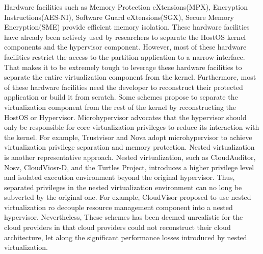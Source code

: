 
Hardware facilities such as Memory Protection eXtensions(MPX), Encryption Instructions(AES-NI), Software Guard eXtensions(SGX), Secure Memory Encryption(SME) provide efficient memory isolation. These hardware facilities have already been actively used by researchers to separate the HostOS kernel components and the hypervisor component. 
However, most of these hardware facilities restrict the access to the partition application to a narrow interface.
That makes it to be extremely tough to leverage these hardware facilities to separate the entire virtualization component from the kernel. Furthermore, most of these hardware facilities need the developer to reconstruct their protected application or build it from scratch. 
Some schemes propose to separate the virtualization component from the rest of the kernel by reconstructing the HostOS or Hypervisor.
Microhypervisor advocates that the hypervisor should only be responsible for core virtualization privileges to reduce its interaction with the kernel. For example, Trustvisor and Nova adopt microhypervisor to achieve virtualization privilege separation and memory protection. 
Nested virtualization is another representative approach. 
Nested virtualization, such as CloudAuditor, Nosv, CloudViosr-D\cite{mi2020mostly}, and the Turtles Project, introduces a higher privilege level and isolated execution environment beyond the original hypervisor. 
Thus, separated privileges in the nested virtualization environment can no long be subverted by the original one. For example, CloudVisor proposed to use nested virtualization ro decouple resource management component into a nested hypervisor. 
Nevertheless, These schemes has been deemed unrealistic for the cloud providers in that cloud providers could not reconstruct their cloud architecture, let along the significant performance losses introduced by nested virtualization.

